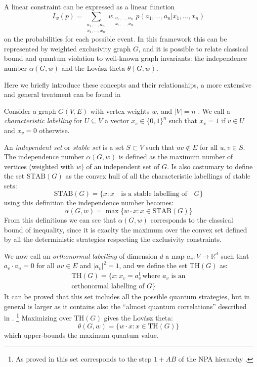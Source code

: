 \documentclass[
    nofootinbin,
    floatfix,
    amsfonts,
    twocolumn, 
    aps, 
    prl]{revtex4-1}
\newcommand{\Real}{\mathbb{R}}
\newcommand{\STAB}{\mathrm{STAB}}
\renewcommand{\TH}{\mathrm{TH}}
\begin{document}
A linear constraint can be expressed as a linear function 
\begin{equation}
    I_w(p) = \sum_{\substack{a_1,\ldots,a_n\\x_1,\ldots,x_n}}
w_{\substack{a_1,\ldots,a_n\\x_1,\ldots,x_n}} p(a_1,\ldots,a_n|x_1,\ldots,x_n)
\end{equation}
 on the probabilities for each possible event.
In this framework this can be represented by weighted exclusivity graph $G$, and it
is possible to relate classical bound and quantum violation to well-known graph
invariants: the independence number $\alpha(G, w)$ and the Lovász theta
$\theta(G, w)$.

Here we briefly introduce these concepts and their relationships, a more
extensive and general treatment can be found in \cite{cabello2014, rabelo2014} %

Consider a graph $G(V,E)$ with vertex weights $w$, and $|V| = n$ .
We call a \emph{characteristic labelling} for $U \subseteq V$ a vector $x_v \in
\{0,1\}^n$ such that $x_v = 1$ if $v \in U$ and $x_v = 0$ otherwise.

An \emph{independent set} or \emph{stable set} is a set
$S \subset V$ such that $uv \notin E$ for all $u,v \in S$.
The independence number $\alpha(G, w)$ is defined as the maximum number of
vertices (weighted with $w$) of an independent set of $G$.
Is also costumary to define the set $\STAB(G)$ as the convex hull of all the
characteristic labellings of stable sets:
\begin{equation}
    \STAB(G) = \{x : x \quad \text{is a stable labelling of}\quad G \}
    \label{eq:stab}
\end{equation}
using this definition the independence number becomes:
\begin{equation}
    \alpha(G,w) = \max\{w\cdot x: x \in \STAB(G)\}
    \label{eq:alphastab}
\end{equation}
From this definitions we can see that $\alpha(G,w)$ corresponds to the classical
bound of inequality, since it is exaclty the maximum over the convex set defined
by all the deterministic strategies respecting the exclusivity constraints.

We now call an \emph{orthonormal labelling} of dimension $d$ a map
$a_v:V\rightarrow\Real^d$ such that $a_v \cdot a_u = 0$ for all $uv \in E$ and
$|a_v|^2 = 1$, and we define the set $\TH(G)$ as:
\begin{multline}
    \TH(G) = \{x: x_v = a_v^1 \, \text{where $a_v$ is an} \\ \text{orthonormal labelling of $G$}\}
    \label{eq:thbody}
\end{multline}
It can be proved that this set includes all the possible quantum strategies, but
in general is larger as it contains also the ``almost quantum correlations''
described in .%
\footnote{As proved in \cite{} this set corresponds to the step $1+AB$ of the
NPA hierarchy \cite{}.} %
Maximizing over $\TH(G)$ gives the Lovász theta:
\begin{equation}
    \theta(G,w) = \{w\cdot x : x \in \TH(G)\}
    \label{eq:lovasztheta}
\end{equation}
which upper-bounds the maximum quantum value.
\end{document}
